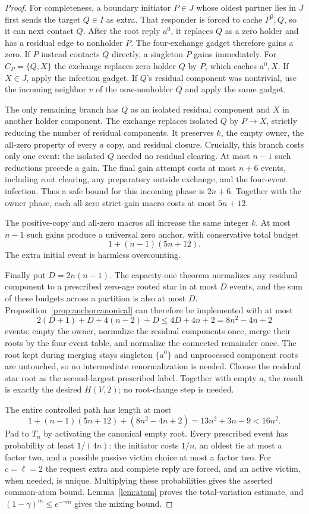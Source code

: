 \begin{proof}
For completeness, a boundary initiator $P\in J$ whose
oldest partner lies in $J$ first sends the target
$Q\in I$ as extra. That responder is forced to cache
$P^0,Q$, so it can next contact $Q$.
After the root reply $a^0$, it replaces $Q$ as a zero
holder and has a residual edge to nonholder $P$.
The four-exchange gadget therefore gains a zero.
If $P$ instead contacts $Q$ directly, a singleton
$P$ gains immediately. For $C_P=\{Q,X\}$ the exchange
replaces zero holder $Q$ by $P$, which caches
$a^0,X$. If $X\in J$, apply the infection gadget.
If $Q$'s residual component was nontrivial, use the
incoming neighbor $v$ of the now-nonholder $Q$
and apply the same gadget.

The only remaining branch has $Q$ as an isolated
residual component and $X$ in another holder component.
The exchange replaces isolated $Q$ by $P\to X$,
strictly reducing the number of residual components.
It preserves $k$, the empty owner, the all-zero
property of every $a$ copy, and residual closure.
Crucially, this branch costs only one event:
the isolated $Q$ needed no residual clearing.
At most $n-1$ such reductions precede a gain.
The final gain attempt costs at most $n+6$ events,
including root clearing, any preparatory outside
exchange, and the four-event infection.
Thus a safe bound for this incoming phase is $2n+6$.
Together with the owner phase, each all-zero strict-gain
macro costs at most $5n+12$.

The positive-copy and all-zero macros all increase
the same integer $k$. At most $n-1$ such gains produce
a universal zero anchor, with conservative total
budget
\[
 1+(n-1)(5n+12).
\]
The extra initial event is harmless overcounting.

Finally put $D=2n(n-1)$. The capacity-one theorem
normalizes any residual component to a prescribed
zero-age rooted star in at most $D$ events, and the
sum of these budgets across a partition is also at
most $D$. Proposition~\ref{prop:anchorcanonical}
can therefore be implemented with at most
\[
 2(D+1)+D+4(n-2)+D
 \le 4D+4n+2=8n^2-4n+2
\]
events: empty the owner, normalize the residual
components once, merge their roots by the four-event
table, and normalize the connected remainder once.
The root kept during merging stays singleton
$\{a^0\}$ and unprocessed component roots are
untouched, so no intermediate renormalization is
needed. Choose the residual star root as the
second-largest prescribed label. Together with
empty $a$, the result is exactly the desired
$H(V,2)$; no root-change step is needed.

The entire controlled path has length at most
\[
 1+(n-1)(5n+12)+(8n^2-4n+2)
 =13n^2+3n-9<16n^2.
\]
Pad to $T_n$ by activating the canonical empty root.
Every prescribed event has probability at least
$1/(4n)$: the initiator costs $1/n$, an oldest tie
at most a factor two, and a possible passive victim
choice at most a factor two. For $c=\ell=2$ the
request extra and complete reply are forced, and
an active victim, when needed, is unique.
Multiplying these probabilities gives the asserted
common-atom bound. Lemma~\ref{lem:atom} proves the
total-variation estimate, and
$(1-\gamma)^m\le e^{-\gamma m}$ gives the mixing bound.
\end{proof}

